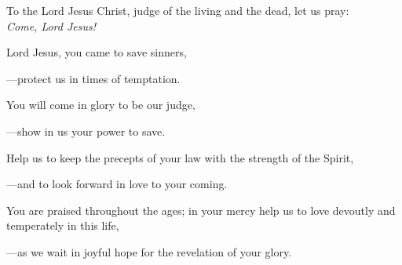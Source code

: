 \intercessions\indent

\begin{hangpar}

To the Lord Jesus Christ, judge of the living and the dead, let us pray:\\
\emph{Come, Lord Jesus!}

\medskip Lord Jesus, you came to save sinners,

{\color{red}---\thinspace}protect us in times of temptation.

\medskip You will come in glory to be our judge,

{\color{red}---\thinspace}show in us your power to save.

\medskip Help us to keep the precepts of your law with the strength of the Spirit,

{\color{red}---\thinspace}and to look forward in love to your coming.

\medskip You are praised throughout the ages; in your mercy help us to love devoutly and temperately in this life,

{\color{red}---\thinspace}as we wait in joyful hope for the revelation of your glory.

\medskip

\end{hangpar}